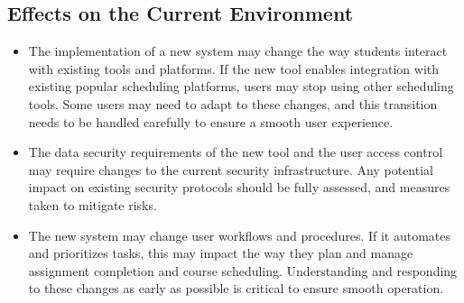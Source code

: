 \documentclass[12pt]{article}
\begin{document}
\subsection{Effects on the Current Environment}

\begin{itemize}
    \item The implementation of a new system may change the way students interact with existing tools and platforms. If the new tool enables integration with existing popular scheduling platforms, users may stop using other scheduling tools. Some users may need to adapt to these changes, and this transition needs to be handled carefully to ensure a smooth user experience.

    \item The data security requirements of the new tool and the user access control may require changes to the current security infrastructure. Any potential impact on existing security protocols should be fully assessed, and measures taken to mitigate risks.

    \item The new system may change user workflows and procedures. If it automates and prioritizes tasks, this may impact the way they plan and manage assignment completion and course scheduling. Understanding and responding to these changes as early as possible is critical to ensure smooth operation.
\end{itemize}
\end{document}
